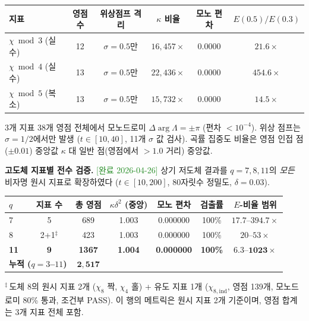 \documentclass[11pt, a4paper]{article}
\theoremstyle{definition}
\theoremstyle{plain}
\begin{document}
\begin{center}
\small
\begin{tabular}{lccccc}
\toprule
\textbf{지표} & \textbf{영점수} & \textbf{위상점프 격리}
  & \textbf{$\kappa$ 비율} & \textbf{모노 편차}
  & \textbf{$E(0.5)/E(0.3)$} \\
\midrule
$\chi\bmod 3$ (실수)    & 12 & $\sigma{=}0.5$만 & $16{,}457\times$ & 0.0000 & $21.6\times$ \\
$\chi\bmod 4$ (실수)    & 13 & $\sigma{=}0.5$만 & $22{,}436\times$ & 0.0000 & $454.6\times$ \\
$\chi\bmod 5$ (복소) & 13 & $\sigma{=}0.5$만 & $15{,}732\times$ & 0.0000 & $14.5\times$ \\
\bottomrule
\end{tabular}
\end{center}

\noindent
3개 지표 38개 영점 전체에서 모노드로미 $\Delta\arg\Lambda = \pm\pi$ (편차 $< 10^{-4}$). 위상 점프는 $\sigma = 1/2$에서만 발생 ($t\in[10,40]$, 11개 $\sigma$ 값 검사). 곡률 집중도 비율은 영점 인접 점($\pm 0.01$) 중앙값 $\kappa$ 대 일반 점(영점에서 $>1.0$ 거리) 중앙값.

\medskip\noindent
\textbf{고도체 지표별 전수 검증.}
\textcolor{ForestGreen}{[완료 2026-04-26]}
상기 저도체 결과를 $q = 7, 8, 11$의 \emph{모든} 비자명 원시 지표로 확장하였다
($t\in[10,200]$, 80자릿수 정밀도, $\delta{=}0.03$).

\begin{center}
\small
\begin{tabular}{lcccccc}
\toprule
$q$ & 지표 수 & 총 영점 & $\kappa\delta^2$ (중앙) & 모노 편차 & 검출률 & $E$-비율 범위 \\
\midrule
7 & 5 & 689 & 1.003 & 0.000000 & 100\% & $17.7$--$394.7\times$ \\
8 & 2+1${}^\ddagger$ & 423 & 1.003 & 0.000000 & 100\% & $20$--$53\times$ \\
\textbf{11} & \textbf{9} & \textbf{1367} & \textbf{1.004} & \textbf{0.000000} & \textbf{100\%} & $\mathbf{6.3}$--$\mathbf{1023\times}$ \\
\midrule
\multicolumn{2}{l}{\textbf{누적 ($q = 3$--$11$)}} & $\mathbf{2{,}517}$ & & & & \\
\bottomrule
\end{tabular}
\end{center}

\noindent
${}^\ddagger$\,도체 8의 원시 지표 2개 ($\chi_8$ 짝, $\chi_4$ 홀) + 유도 지표 1개
($\chi_{8,\mathrm{ind}}$, 영점 139개, 모노드로미 80\% 통과, 조건부 PASS).
이 행의 메트릭은 원시 지표 2개 기준이며, 영점 합계는 3개 지표 전체 포함.
\end{document}
